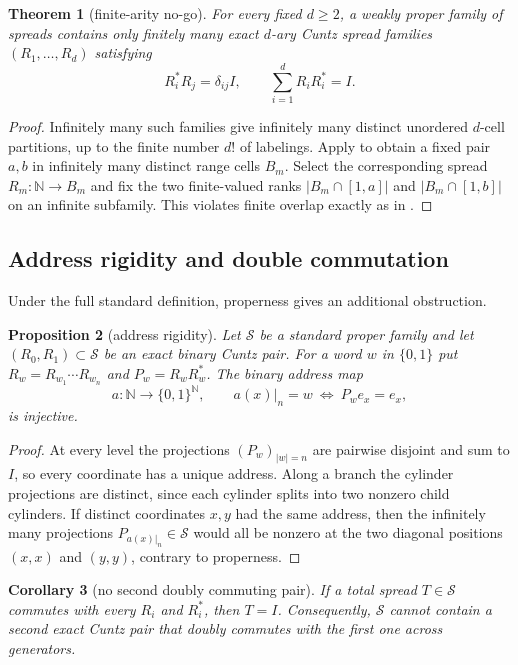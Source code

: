 \documentclass[11pt]{article}
\newtheorem{theorem}{Theorem}[section]
\newtheorem{proposition}[theorem]{Proposition}
\newtheorem{corollary}[theorem]{Corollary}
\theoremstyle{definition}
\theoremstyle{remark}
\newcommand{\N}{\mathbb N}
\begin{document}
\begin{theorem}[finite-arity no-go]\label{thm:dary}
For every fixed $d\ge2$, a weakly proper family of spreads contains only
finitely many exact $d$-ary Cuntz spread families
$(R_1,\dots,R_d)$ satisfying
\[
 R_i^*R_j=\delta_{ij}I,
 \qquad \sum_{i=1}^dR_iR_i^*=I.
\]
\end{theorem}

\begin{proof}
Infinitely many such families give infinitely many distinct unordered
$d$-cell partitions, up to the finite number $d!$ of labelings.  Apply
 to obtain a fixed pair $a,b$ in infinitely many distinct
range cells $B_m$.  Select the corresponding spread $R_m:\N\to B_m$ and fix
the two finite-valued ranks $|B_m\cap[1,a]|$ and $|B_m\cap[1,b]|$ on an
infinite subfamily.  This violates finite overlap exactly as in
.
\end{proof}

\subsection{Address rigidity and double commutation}

Under the full standard definition, properness gives an additional obstruction.

\begin{proposition}[address rigidity]\label{prop:address}
Let $\mathscr S$ be a standard proper family and let $(R_0,R_1)\subset\mathscr S$
be an exact binary Cuntz pair.  For a word $w$ in $\{0,1\}$ put
$R_w=R_{w_1}\cdots R_{w_n}$ and $P_w=R_wR_w^*$.  The binary address map
\[
 a:\N\longrightarrow\{0,1\}^{\N},
 \qquad
 a(x)|_n=w\ \Longleftrightarrow\ P_we_x=e_x,
\]
is injective.
\end{proposition}

\begin{proof}
At every level the projections $(P_w)_{|w|=n}$ are pairwise disjoint and sum to
$I$, so every coordinate has a unique address.  Along a branch the cylinder
projections are distinct, since each cylinder splits into two nonzero child
cylinders.  If distinct coordinates $x,y$ had the same address, then the
infinitely many projections $P_{a(x)|_n}\in\mathscr S$ would all be nonzero at
the two diagonal positions $(x,x)$ and $(y,y)$, contrary to properness.
\end{proof}

\begin{corollary}[no second doubly commuting pair]\label{cor:double-commuting}
If a total spread $T\in\mathscr S$ commutes with every $R_i$ and $R_i^*$, then
$T=I$.  Consequently, $\mathscr S$ cannot contain a second exact Cuntz pair
that doubly commutes with the first one across generators.
\end{corollary}
\end{document}
